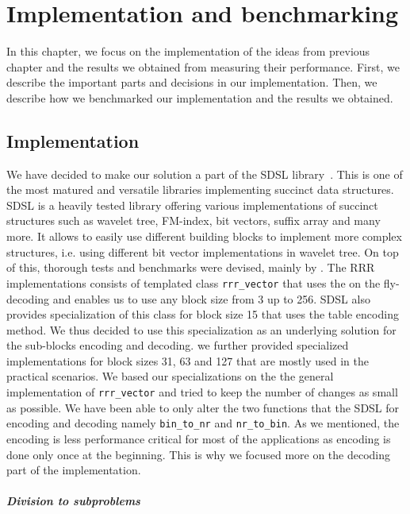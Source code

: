 \chapter{Implementation and benchmarking}
\label{kap:kap4}

In this chapter, we focus on the implementation of the ideas from previous chapter
and the results we obtained from measuring their performance. First, we describe the
important parts and decisions in our implementation. Then, we describe how we
benchmarked our implementation and the results we obtained.

\section{Implementation}

We have decided to make our solution a part of the SDSL library~\citep{gog2014theory}. This
is one of the most matured and versatile libraries implementing succinct data structures.
SDSL is a heavily tested library offering various implementations of succinct
structures such as wavelet tree, FM-index, bit vectors, suffix array and many more.
It allows to easily use different building blocks to implement more complex structures,
i.e. using different bit vector implementations in wavelet tree. On top of this, thorough
tests and benchmarks were devised, mainly by \cite{gog2014optimized}.
The RRR implementations consists of templated class \texttt{rrr\_vector} that uses the on the fly-decoding
and enables us to use any block size from 3 up to 256. SDSL also provides specialization
of this class for block size 15 that uses the table encoding method. We thus decided to use
this specialization as an underlying solution for the sub-blocks encoding and decoding. we further
provided specialized implementations for block sizes 31, 63 and 127 that are mostly used in the
practical scenarios. We based our specializations on the the general implementation of
\texttt{rrr\_vector} and tried to keep the number of changes as small as possible. We have been able
to only alter the two functions that the SDSL for encoding and decoding namely \texttt{bin\_to\_nr}
and \texttt{nr\_to\_bin}. As we mentioned, the encoding is less performance critical for most of the
applications as encoding is done only once at the beginning. This is why we focused more on the
decoding part of the implementation.

\paragraph{Division to subproblems}

